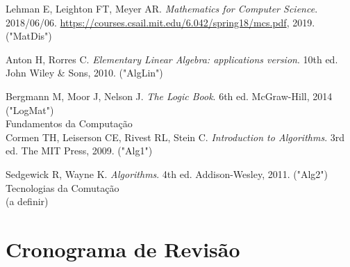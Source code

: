 \documentclass[a4paper]{inzane_syllabus} %
\begin{document}
Lehman E, Leighton FT, Meyer AR. \emph{Mathematics for Computer Science}. 2018/06/06.
\url{https://courses.csail.mit.edu/6.042/spring18/mcs.pdf}, 2019. ("MatDis")

Anton H, Rorres C. \emph{Elementary Linear Algebra: applications version}. 10th
ed. John Wiley \& Sons, 2010. ("AlgLin")

Bergmann M, Moor J, Nelson J. \emph{The Logic Book}. 6th ed. McGraw-Hill, 2014
("LogMat")\\

{\color{myCOLOR} Fundamentos da Computação}\\
Cormen TH, Leiserson CE, Rivest RL, Stein C. \emph{Introduction to Algorithms}.
3rd ed. The MIT Press, 2009. ("Alg1")

Sedgewick R, Wayne K. \emph{Algorithms}. 4th ed. Addison-Wesley, 2011. ("Alg2")\\

{\color{myCOLOR} Tecnologias da Comutação}\\
(a definir)


\newpage
\makeFullPage
\section{Cronograma de Revisão}
\end{document}
